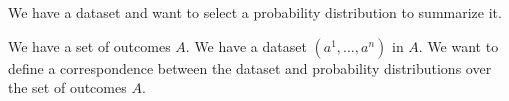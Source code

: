 

We have a dataset and want to select
a probability distribution to summarize it.


We have a set of outcomes $A$.
We have a dataset $(a^1, \dots, a^n)$
in $A$.
We want to define a correspondence between
the dataset and probability distributions
over the set of outcomes $A$.
